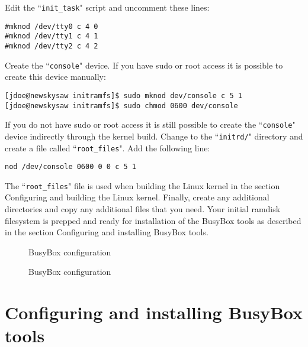 \documentclass{article}[11pt]
\def\colfigsize{\epsfxsize=5in}
\begin{document}
\noindent
Edit the ``\verb|init_task|" script and uncomment these lines:

\begin{verbatim}
#mknod /dev/tty0 c 4 0
#mknod /dev/tty1 c 4 1
#mknod /dev/tty2 c 4 2
\end{verbatim}

\pagebreak

\noindent
Create the ``\verb|console|" device. If you have sudo or root access it is
possible to create this device manually:

\begin{verbatim}
[jdoe@newskysaw initramfs]$ sudo mknod dev/console c 5 1
[jdoe@newskysaw initramfs]$ sudo chmod 0600 dev/console
\end{verbatim}

\noindent
If you do not have sudo or root access it is still possible to create the
``\verb|console|" device indirectly through the kernel build.  Change to the
``\verb|initrd/|" directory and create a file called ``\verb|root_files|". Add
the following line:

\begin{verbatim}
nod /dev/console 0600 0 0 c 5 1
\end{verbatim}

\noindent
The ``\verb|root_files|" file is used when building the Linux kernel in the
section Configuring and building the Linux kernel. Finally, create any
additional directories and copy any additional files that you need. Your initial
ramdisk filesystem is prepped and ready for installation of the BusyBox tools as
described in the section Configuring and installing BusyBox tools.



\pagebreak
\begin{figure}[ht]
  \begin{center}
    \colfigsize{}
    \caption{BusyBox configuration}
    \label{fig:busyboxcf1}
  \end{center}
\end{figure}

\begin{figure}[ht]
  \begin{center}
    \colfigsize{}
  \end{center}
  \caption{BusyBox configuration}
  \label{fig:busyboxcf2}
\end{figure}

\section{Configuring and installing BusyBox tools}
\end{document}
